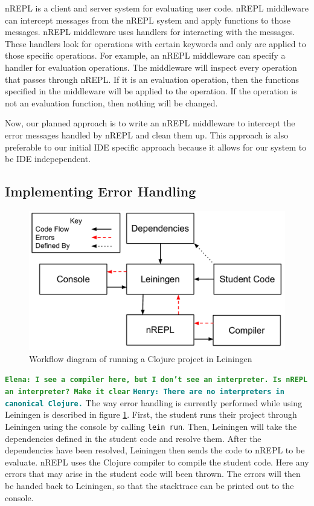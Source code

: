 \documentclass[12pt]{article}
\newcommand{\comment}[1]{{\bf \tt  {#1}}}
\newcommand{\emcomment}[1]{\textcolor{ForestGreen}{\comment{Elena: {#1}}}}
\newcommand{\hfcomment}[1]{\textcolor{Teal}{\comment{Henry: {#1}}}}
\begin{document}
nREPL is a client and server system for evaluating user code. nREPL middleware can intercept messages from the nREPL system and apply functions to those messages. nREPL middleware uses handlers for interacting with the messages. These handlers look for operations with certain keywords and only are applied to those specific operations. For example, an nREPL middleware can specify a handler for evaluation operations. The middleware will inspect every operation that passes through nREPL. If it is an evaluation operation, then the functions specified in the middleware will be applied to the operation. If the operation is not an evaluation function, then nothing will be changed.

Now, our planned approach is to write an nREPL middleware to intercept the error messages handled by nREPL and clean them up. This approach is also preferable to our initial IDE specific approach because it allows for our system to be IDE indepependent. 

\subsection{Implementing Error Handling}

\begin{figure}[h]
 \includegraphics[width=12cm]{CurrentErrorHandling.pdf}
 \centering
 \caption{Workflow diagram of running a Clojure project in Leiningen}
 \label{fig:CurrentError}
\end{figure}

\emcomment{I see a compiler here, but I don't see an interpreter. Is nREPL an interpreter? Make it clear} \hfcomment{There are no interpreters in canonical Clojure.}
The way error handling is currently performed while using Leiningen is described in figure \ref{fig:CurrentError}. First, the student runs their project through Leiningen using the console by calling \texttt{lein run}. Then, Leiningen will take the dependencies defined in the student code and resolve them. After the dependencies have been resolved, Leiningen then sends the code to nREPL to be evaluate. nREPL uses the Clojure compiler to compile the student code. Here any errors that may arise in the student code will been thrown. The errors will then be handed back to Leiningen, so that the stacktrace can be printed out to the console.
\end{document}

